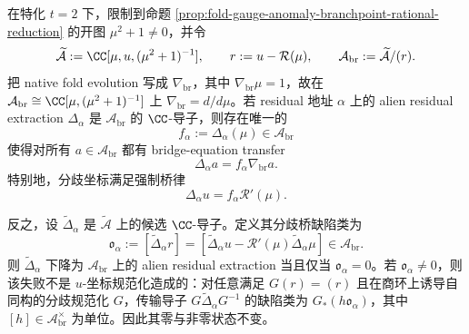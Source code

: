 \begin{proposition}\label{distill:ecalle_resurgence_mould_calculus_and_alien_derivatives-alien_fold_bridge_family-fold-branchpoint-rational-chart-bridge-rigidity}
在特化 \(t=2\) 下，限制到命题 \ref{prop:fold-gauge-anomaly-branchpoint-rational-reduction} 的开图 \(\mu^2+1\neq0\)，并令
\[
\widetilde{\mathcal A}:=\CC[\mu,u,(\mu^2+1)^{-1}],\qquad
r:=u-\mathcal R(\mu),\qquad
\mathcal A_{\mathrm{br}}:=\widetilde{\mathcal A}/(r).
\]
把 native fold evolution 写成 \(\nabla_{\mathrm{br}}\)，其中 \(\nabla_{\mathrm{br}}\mu=1\)，故在 \(\mathcal A_{\mathrm{br}}\cong \CC[\mu,(\mu^2+1)^{-1}]\) 上 \(\nabla_{\mathrm{br}}=d/d\mu\)。若 residual 地址 \(\alpha\) 上的 alien residual extraction \(\Delta_\alpha\) 是 \(\mathcal A_{\mathrm{br}}\) 的 \(\CC\)-导子，则存在唯一的
\[
f_\alpha:=\Delta_\alpha(\mu)\in\mathcal A_{\mathrm{br}}
\]
使得对所有 \(a\in\mathcal A_{\mathrm{br}}\) 都有 bridge-equation transfer
\[
\Delta_\alpha a=f_\alpha\nabla_{\mathrm{br}}a.
\]
特别地，分歧坐标满足强制桥律
\[
\Delta_\alpha u=f_\alpha\mathcal R'(\mu).
\]

反之，设 \(\widetilde\Delta_\alpha\) 是 \(\widetilde{\mathcal A}\) 上的候选 \(\CC\)-导子。定义其分歧桥缺陷类为
\[
\mathfrak o_\alpha:=[\widetilde\Delta_\alpha r]
=[\widetilde\Delta_\alpha u-\mathcal R'(\mu)\widetilde\Delta_\alpha\mu]
\in \mathcal A_{\mathrm{br}}.
\]
则 \(\widetilde\Delta_\alpha\) 下降为 \(\mathcal A_{\mathrm{br}}\) 上的 alien residual extraction 当且仅当 \(\mathfrak o_\alpha=0\)。若 \(\mathfrak o_\alpha\neq0\)，则该失败不是 \(u\)-坐标规范化造成的：对任意满足 \(G(r)=(r)\) 且在商环上诱导自同构的分歧规范化 \(G\)，传输导子 \(G\widetilde\Delta_\alpha G^{-1}\) 的缺陷类为 \(G_\ast(h\mathfrak o_\alpha)\)，其中 \([h]\in\mathcal A_{\mathrm{br}}^\times\) 为单位。因此其零与非零状态不变。
\end{proposition}
